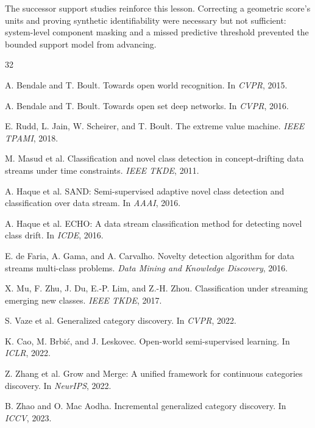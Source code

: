 \documentclass[10pt]{article}
\begin{document}
The successor support studies reinforce this lesson. Correcting a geometric
score's units and proving synthetic identifiability were necessary but not
sufficient: system-level component masking and a missed predictive threshold
prevented the bounded support model from advancing.

\begin{thebibliography}{32}

A. Bendale and T. Boult.
\newblock Towards open world recognition.
\newblock In \emph{CVPR}, 2015.

A. Bendale and T. Boult.
\newblock Towards open set deep networks.
\newblock In \emph{CVPR}, 2016.

E. Rudd, L. Jain, W. Scheirer, and T. Boult.
\newblock The extreme value machine.
\newblock \emph{IEEE TPAMI}, 2018.

M. Masud et al.
\newblock Classification and novel class detection in concept-drifting data
streams under time constraints.
\newblock \emph{IEEE TKDE}, 2011.

A. Haque et al.
\newblock SAND: Semi-supervised adaptive novel class detection and
classification over data stream.
\newblock In \emph{AAAI}, 2016.

A. Haque et al.
\newblock ECHO: A data stream classification method for detecting novel class
drift.
\newblock In \emph{ICDE}, 2016.

E. de Faria, A. Gama, and A. Carvalho.
\newblock Novelty detection algorithm for data streams multi-class problems.
\newblock \emph{Data Mining and Knowledge Discovery}, 2016.

X. Mu, F. Zhu, J. Du, E.-P. Lim, and Z.-H. Zhou.
\newblock Classification under streaming emerging new classes.
\newblock \emph{IEEE TKDE}, 2017.

S. Vaze et al.
\newblock Generalized category discovery.
\newblock In \emph{CVPR}, 2022.

K. Cao, M. Brbi\'c, and J. Leskovec.
\newblock Open-world semi-supervised learning.
\newblock In \emph{ICLR}, 2022.

Z. Zhang et al.
\newblock Grow and Merge: A unified framework for continuous categories
discovery.
\newblock In \emph{NeurIPS}, 2022.

B. Zhao and O. Mac Aodha.
\newblock Incremental generalized category discovery.
\newblock In \emph{ICCV}, 2023.


\end{thebibliography}
\end{document}
